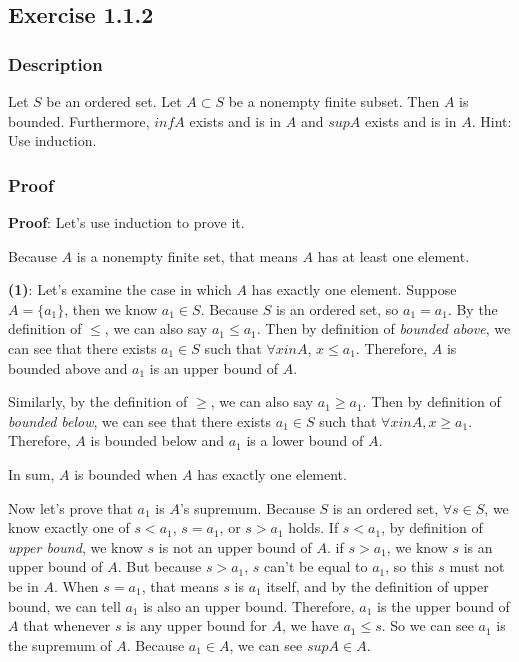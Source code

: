 \documentclass[12pt, letterpaper, oneside]{book}
\begin{document}
\subsection{Exercise 1.1.2}

\subsubsection{Description}

Let $S$ be an ordered set. Let $A \subset S$ be a nonempty finite subset. Then $A$ is bounded. Furthermore, $inf A$
exists and is in $A$ and $sup A$ exists and is in $A$. Hint: Use induction.

\subsubsection{Proof}

\textbf{Proof}: Let's use induction to prove it.

Because $A$ is a nonempty finite set, that means $A$ has at least one element.

\textbf{(1)}: Let's examine the case in which $A$ has exactly one element. Suppose $A = \{ a_1 \}$, then we know
$a_1 \in S$. Because $S$ is an ordered set, so $a_1 = a_1$. By the definition of $\le$, we can also say $a_1 \le a_1$.
Then by definition of \textit{bounded above}, we can see that there exists $a_1 \in S$ such that $\forall x in A$,
$x \le a_1$. Therefore, $A$ is bounded above and $a_1$ is an upper bound of $A$.

Similarly, by the definition of $\ge$, we can also say $a_1 \ge a_1$. Then by definition of \textit{bounded below}, we
can see that there exists $a_1 \in S$ such that $\forall x in A, x \ge a_1$. Therefore, $A$ is bounded below and $a_1$
is a lower bound of $A$.

In sum, $A$ is bounded when $A$ has exactly one element.

Now let's prove that $a_1$ is $A$'s supremum. Because $S$ is an ordered set, $\forall s \in S$, we know exactly one of
$s < a_1$, $s = a_1$, or $s > a_1$ holds. If $s < a_1$, by definition of \textit{upper bound}, we know $s$ is not an
upper bound of $A$. if $s > a_1$, we know $s$ is an upper bound of $A$. But because $s > a_1$, $s$ can't be equal to
$a_1$, so this $s$ must not be in $A$. When $s = a_1$, that means $s$ is $a_1$ itself, and by the definition of upper
bound, we can tell $a_1$ is also an upper bound. Therefore, $a_1$ is the upper bound of $A$ that whenever $s$ is any
upper bound for $A$, we have $a_1 \le s$. So we can see $a_1$ is the supremum of $A$. Because $a_1 \in A$, we can see
$sup A \in A$.
\end{document}
